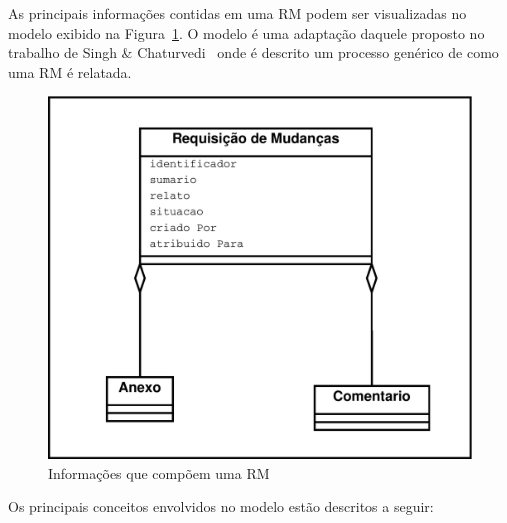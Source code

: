 As principais informações contidas em uma RM podem ser visualizadas no modelo
exibido na Figura~\ref{fig:diagrama-classe-atributos-requisicao-mudancas}. O
modelo é uma adaptação daquele proposto no trabalho de Singh \&
Chaturvedi~\cite{singh2011bug} onde é descrito um processo genérico de como uma
RM é relatada.

\begin{figure}[htpb]
	\centering
	\includegraphics[width=0.8\linewidth]{./chapter-manutencao-software-visao-geral/img/diagrama-classe-atributos-requisicao-mudancas.pdf}
	\caption{Informações que compõem uma RM}
	\label{fig:diagrama-classe-atributos-requisicao-mudancas}
\end{figure}

Os principais conceitos envolvidos no modelo estão descritos a seguir:

